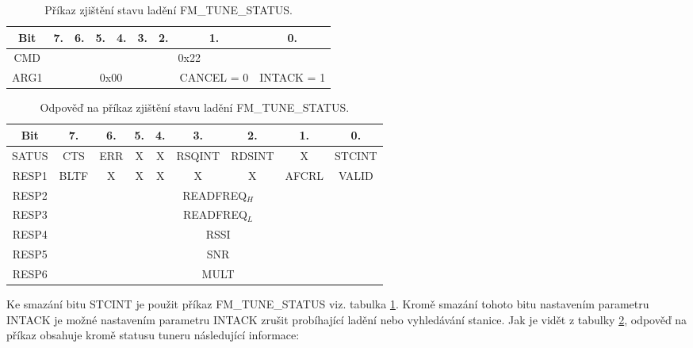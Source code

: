 \begin{table}[ht!]
\begin{center}
\begin{tabular}{|c|c|c|c|c|c|c|c|c|}
\hline 
Bit & 7. & 6. & 5. & 4. & 3. & 2. & 1. & 0. \\ 
\hline 
CMD & \multicolumn{8}{c|}{0x22} \\ 
\hline 
ARG1 & \multicolumn{6}{c|}{0x00} & CANCEL = 0 & INTACK = 1 \\ 
\hline 
\end{tabular} 
\end{center}
\caption{Příkaz zjištění stavu ladění FM\_TUNE\_STATUS.}
\label{tab:tuner-tune-status} 
\end{table}

\begin{table}[ht!]
\begin{center}
\begin{tabular}{|c|c|c|c|c|c|c|c|c|}
\hline 
Bit & 7. & 6. & 5. & 4. & 3. & 2. & 1. & 0. \\ 
\hline 
SATUS & CTS & ERR & X & X & RSQINT & RDSINT & X & STCINT \\ 
\hline 
RESP1 & BLTF & X & X & X & X & X & AFCRL & VALID \\ 
\hline 
RESP2 & \multicolumn{8}{c|}{READFREQ$_{{H}}$} \\ 
\hline 
RESP3 & \multicolumn{8}{c|}{READFREQ$_{{L}}$} \\ 
\hline 
RESP4 & \multicolumn{8}{c|}{RSSI} \\ 
\hline 
RESP5 & \multicolumn{8}{c|}{SNR} \\ 
\hline 
RESP6 & \multicolumn{8}{c|}{MULT} \\ 
\hline 
\end{tabular} 
\end{center}
\caption{Odpověď na příkaz zjištění stavu ladění FM\_TUNE\_STATUS.}
\label{tab:tuner-tune-status-resp} 
\end{table}

Ke smazání bitu STCINT je použit příkaz FM\_TUNE\_STATUS viz. tabulka \ref{tab:tuner-tune-status}. Kromě smazání tohoto bitu nastavením parametru INTACK je možné nastavením parametru INTACK zrušit probíhající ladění nebo vyhledávání stanice. Jak je vidět z tabulky \ref{tab:tuner-tune-status-resp}, odpověď na příkaz obsahuje kromě statusu tuneru následující informace:

